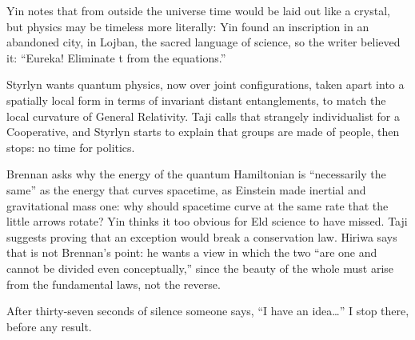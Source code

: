 Yin notes that from outside the universe time would be laid out like a crystal, but physics may be timeless more literally: Yin found an inscription in an abandoned city, in Lojban, the sacred language of science, so the writer believed it: ``Eureka! Eliminate t from the equations.''

Styrlyn wants quantum physics, now over joint configurations, taken apart into a spatially local form in terms of invariant distant entanglements, to match the local curvature of General Relativity. Taji calls that strangely individualist for a Cooperative, and Styrlyn starts to explain that groups are made of people, then stops: no time for politics. 

Brennan asks why the energy of the quantum Hamiltonian is ``necessarily the same'' as the energy that curves spacetime, as Einstein made inertial and gravitational mass one: why should spacetime curve at the same rate that the little arrows rotate? Yin thinks it too obvious for Eld science to have missed. Taji suggests proving that an exception would break a conservation law. Hiriwa says that is not Brennan's point: he wants a view in which the two ``are one and cannot be divided even conceptually,'' since the beauty of the whole must arise from the fundamental laws, not the reverse. 

After thirty-seven seconds of silence someone says, ``I have an idea\ldots'' I stop there, before any result.
